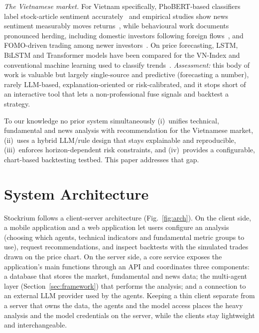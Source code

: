 \documentclass[runningheads]{llncs}
\begin{document}
\emph{The Vietnamese market.} For Vietnam specifically, PhoBERT-based classifiers
label stock-article sentiment accurately~\cite{phobertstock} and empirical studies
show news sentiment measurably moves returns~\cite{vnnews2023}, while behavioural
work documents pronounced herding, including domestic investors following foreign
flows~\cite{vnherd2022}, and FOMO-driven trading among newer
investors~\cite{vnfomo}. On price forecasting, LSTM, BiLSTM and Transformer models
have been compared for the VN-Index and conventional machine learning used to
classify trends~\cite{vndl2025,vnlstm2021,vnml2024}. \emph{Assessment:} this body
of work is valuable but largely single-source and predictive (forecasting a
number), rarely LLM-based, explanation-oriented or risk-calibrated, and it stops
short of an interactive tool that lets a non-professional fuse signals and backtest
a strategy.

To our knowledge no prior system simultaneously (i)~unifies technical, fundamental
and news analysis with recommendation for the Vietnamese market, (ii)~uses a
hybrid LLM/rule design that stays explainable and reproducible, (iii)~enforces
horizon-dependent risk constraints, and (iv)~provides a configurable, chart-based
backtesting testbed. This paper addresses that gap.

\section{System Architecture}
\label{sec:architecture}

Stockrium follows a client-server architecture (Fig.~\ref{fig:arch}). On the
client side, a mobile application and a web application let users configure an
analysis (choosing which agents, technical indicators and fundamental metric
groups to use), request recommendations, and inspect backtests with the simulated
trades drawn on the price chart. On the server side, a core service exposes the
application's main functions through an API and coordinates three components: a
database that stores the market, fundamental and news data; the multi-agent layer
(Section~\ref{sec:framework}) that performs the analysis; and a connection to an
external LLM provider used by the agents. Keeping a thin client separate from a
server that owns the data, the agents and the model access places the heavy
analysis and the model credentials on the server, while the clients stay
lightweight and interchangeable.
\end{document}
